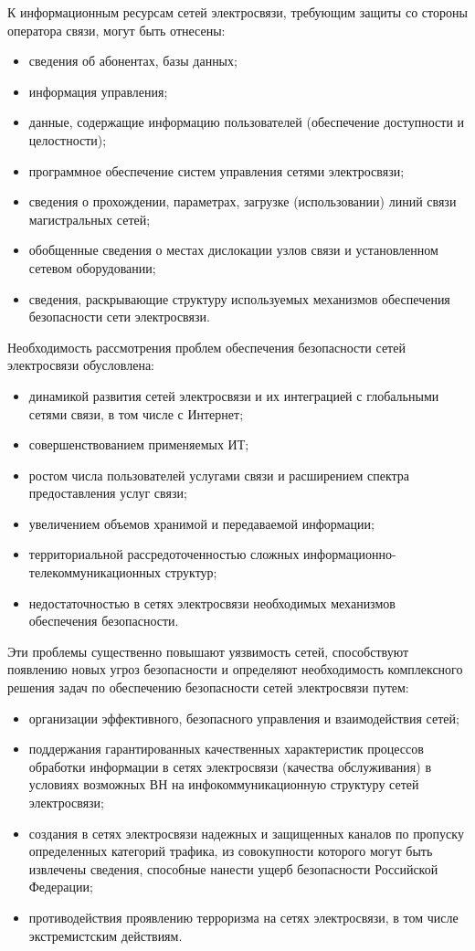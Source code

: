 \documentclass[12pt, russian, oneside, article]{ncc}
\begin{document}
К информационным ресурсам сетей электросвязи, требующим защиты со стороны оператора связи, могут быть отнесены:
\begin{itemize}
\item сведения об абонентах, базы данных;
\item информация управления;
\item данные, содержащие информацию пользователей (обеспечение доступности и целостности);
\item программное обеспечение систем управления сетями электросвязи;
\item сведения о прохождении, параметрах, загрузке (использовании) линий связи магистральных сетей;
\item обобщенные сведения о местах дислокации узлов связи и установленном сетевом оборудовании;
\item сведения, раскрывающие структуру используемых механизмов обеспечения безопасности сети электросвязи.
\end{itemize}

Необходимость рассмотрения проблем обеспечения безопасности сетей электросвязи обусловлена:
\begin{itemize}
\item динамикой развития сетей электросвязи и их интеграцией с глобальными сетями связи, в том числе с Интернет;
\item совершенствованием применяемых ИТ;
\item ростом числа пользователей услугами связи и расширением спектра предоставления услуг связи;
\item увеличением объемов хранимой и передаваемой информации;
\item территориальной рассредоточенностью сложных информационно-телекоммуникационных структур;
\item недостаточностью в сетях электросвязи необходимых механизмов обеспечения безопасности.
\end{itemize}

Эти проблемы существенно повышают уязвимость сетей, способствуют появлению новых угроз безопасности и определяют необходимость комплексного решения задач по обеспечению безопасности сетей электросвязи путем:
\begin{itemize}
\item организации эффективного, безопасного управления и взаимодействия сетей;
\item поддержания гарантированных качественных характеристик процессов обработки информации в сетях электросвязи (качества обслуживания) в условиях возможных ВН на инфокоммуникационную структуру сетей электросвязи;
\item создания в сетях электросвязи надежных и защищенных каналов по пропуску определенных категорий трафика, из совокупности которого могут быть извлечены сведения, способные нанести ущерб безопасности Российской Федерации;
\item противодействия проявлению терроризма на сетях электросвязи, в том числе экстремистским действиям.
\end{itemize}
\end{document}
